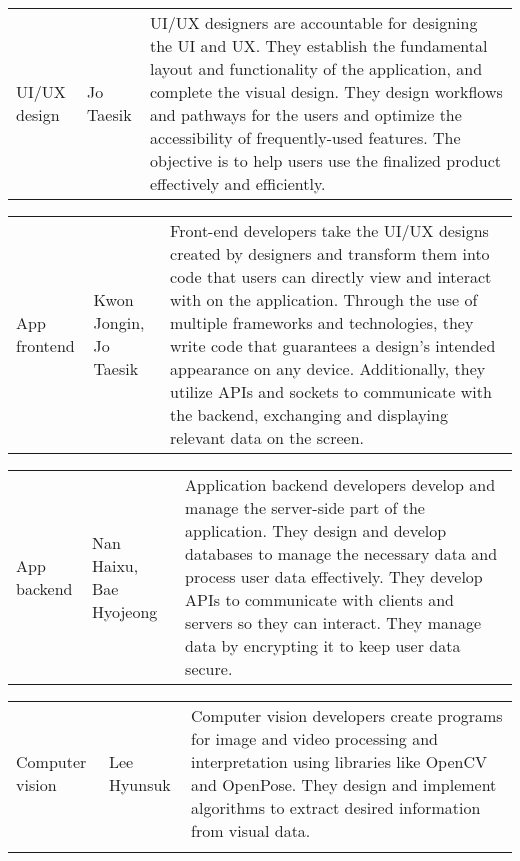 \begin{enumerate}[label=\arabic*]
          \begin{table}[H]
              \center
              \begin{tabular}{m{1.4cm} m{1.5cm} m{4cm}}
                  UI/UX design & Jo Taesik & UI/UX designers are accountable for designing the UI and UX. They establish the fundamental layout and functionality of the application, and complete the visual design. They design workflows and pathways for the users and optimize the accessibility of frequently-used features. The objective is to help users use the finalized product effectively and efficiently. \\
              \end{tabular}
          \end{table}

          \begin{table}[H]
              \center
              \begin{tabular}{m{1.4cm} m{1.5cm} m{4cm}}
                  App frontend & Kwon Jongin, Jo Taesik & Front-end developers take the UI/UX designs created by designers and transform them into code that users can directly view and interact with on the application. Through the use of multiple frameworks and technologies, they write code that guarantees a design’s intended appearance on any device. Additionally, they utilize APIs and sockets to communicate with the backend, exchanging and displaying relevant data on the screen. \\
              \end{tabular}
          \end{table}

          \begin{table}[H]
              \center
              \begin{tabular}{m{1.4cm} m{1.5cm} m{4cm}}
                  App backend & Nan Haixu, Bae Hyojeong & Application backend developers develop and manage the server-side part of the application. They design and develop databases to manage the necessary data and process user data effectively. They develop APIs to communicate with clients and servers so they can interact. They manage data by encrypting it to keep user data secure. \\
              \end{tabular}
          \end{table}

          \begin{table}[H]
              \center
              \begin{tabular}{m{1.4cm} m{1.5cm} m{4cm}}
                  Computer vision & Lee Hyunsuk & Computer vision developers create programs for image and video processing and interpretation using libraries like OpenCV and OpenPose. They design and implement algorithms to extract desired information from visual data. \\\\
                  \bottomrule
              \end{tabular}
          \end{table}

\end{enumerate}

